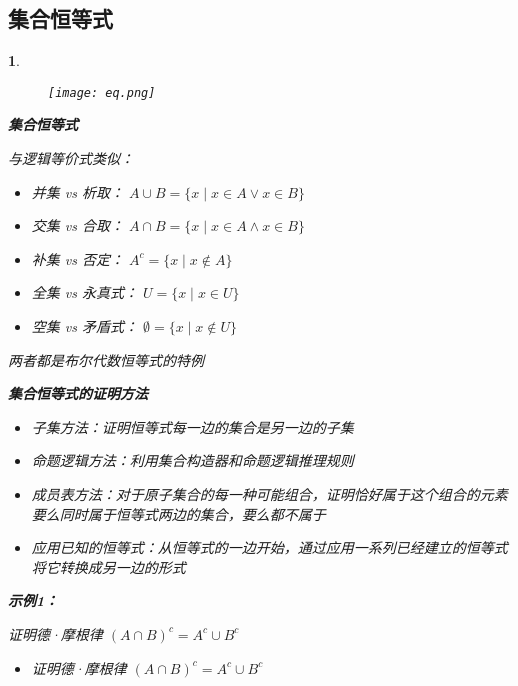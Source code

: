 \documentclass[UTF8]{report}
\theoremstyle{MyLineTheoremStyle} %
\theoremstyle{MyBlockTheoremStyle} %
\theoremstyle{MySubsubsectionStyle} %
\newtheorem{definition}{}
\begin{document}
\subsection{集合恒等式}

\begin{definition}
    \begin{figure}[ht]
        \centering
        \texttt{[image: eq.png]}
    \end{figure}
    \textbf{集合恒等式}\par
    与逻辑等价式类似：\par
    \begin{itemize}
        \item 并集 vs 析取： $A \cup B = \{x \mid x \in A \lor x \in B\}$
        \item 交集 vs 合取： $A \cap B = \{x \mid x \in A \land x \in B\}$
        \item 补集 vs 否定： $A^c = \{x \mid x \notin A\}$
        \item 全集 vs 永真式： $U = \{x \mid x \in U\}$
        \item 空集 vs 矛盾式： $\emptyset = \{x \mid x \notin U\}$
    \end{itemize}
    两者都是布尔代数恒等式的特例\par

    \textbf{集合恒等式的证明方法}\par
    \begin{itemize}
        \item 子集方法：证明恒等式每一边的集合是另一边的子集
        \item 命题逻辑方法：利用集合构造器和命题逻辑推理规则
        \item 成员表方法：对于原子集合的每一种可能组合，证明恰好属于这个组合的元素要么同时属于恒等式两边的集合，要么都不属于
        \item 应用已知的恒等式：从恒等式的一边开始，通过应用一系列已经建立的恒等式将它转换成另一边的形式
    \end{itemize}

    \textbf{示例1：}\par
    证明德·摩根律 $(A \cap B)^c = A^c \cup B^c $\par
    \begin{itemize}
        \item 证明德·摩根律 $(A \cap B)^c = A^c \cup B^c $\par


\end{itemize}
\end{definition}
\end{document}
